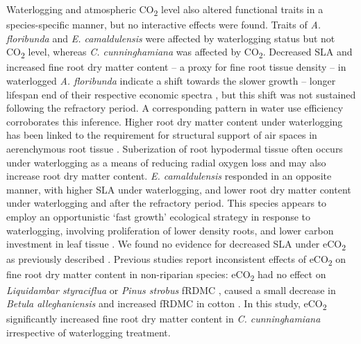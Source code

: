 \documentclass[12pt,a4paper]{memoir}
\begin{document}
Waterlogging and atmospheric CO\textsubscript{2} level also altered functional traits in a species-specific manner, but no interactive effects were found. Traits of \textit{A. floribunda} and \textit{E. camaldulensis} were affected by waterlogging status but not CO\textsubscript{2} level, whereas \textit{C. cunninghamiana} was affected by CO\textsubscript{2}. Decreased SLA and increased fine root dry matter content – a proxy for fine root tissue density \citep{Birouste2013} – in waterlogged \textit{A. floribunda} indicate a shift towards the slower growth – longer lifespan  end of their respective economic spectra \citep{Reich2014a}, but this shift was not sustained following the refractory period. A corresponding pattern in water use efficiency corroborates this inference. Higher root dry matter content under waterlogging has been linked to the requirement for structural support of air spaces in aerenchymous root tissue \citep{Ryser2011}. Suberization of root hypodermal tissue often occurs under waterlogging as a means of reducing radial oxygen loss \citep{Visser2000, DeSimone2002} and may also increase root dry matter content. \textit{E. camaldulensis} responded in an opposite manner, with higher SLA under waterlogging, and lower root dry matter content under waterlogging and after the refractory period. This species appears to employ an opportunistic ‘fast growth’ ecological strategy in response to waterlogging, involving proliferation of lower density roots, and lower carbon investment in leaf tissue \citep{Wright2004, Reich2014a}. We found no evidence for decreased SLA under eCO\textsubscript{2} as previously described \citep{Poorter2003a}. Previous studies report inconsistent effects of eCO\textsubscript{2} on fine root dry matter content in non-riparian species: eCO\textsubscript{2} had no effect on \textit{Liquidambar styraciflua} or \textit{Pinus strobus} fRDMC \citep{Bauer2001,Iversen2008}, caused a small decrease in \textit{Betula alleghaniensis} \citep{Bauer2001} and increased fRDMC in cotton \citep{Prior1994}. In this study, eCO\textsubscript{2} significantly increased fine root dry matter content in \textit{C. cunninghamiana} irrespective of waterlogging treatment.
\end{document}
